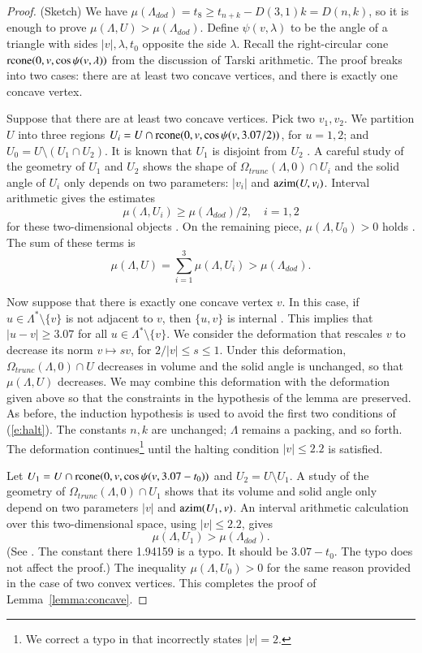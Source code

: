 \begin{proof} (Sketch)  We have 
$\mu(\Lambda_{dod}) = t_8 \ge t_{n+k} - D(3,1)k = D(n,k)$, so it is
enough to prove $\mu(\Lambda,U) > \mu(\Lambda_{dod})$. 
Define $\psi(v,\lambda)$ to be the angle of a triangle with sides $|v|,\lambda,t_0$
opposite the side $\lambda$.  Recall the right-circular cone 
${\operatorname{rcone}}(0,v,\cos\psi(v,\lambda))$ from the discussion of Tarski arithmetic.
The proof breaks into two
cases: there are at least two concave vertices, and there is exactly one concave vertex.

Suppose that there are at least two concave vertices.  Pick two $v_1,v_2$.
We partition $U$ into three
regions $U_i = U\cap {\operatorname{rcone}}(0,v,\cos\psi(v,3.07/2))$, for $u=1,2$; and
$U_0= U\setminus (U_1\cap U_2)$.  It is known that
$U_1$ is disjoint from $U_2$ \cite[Lemma~3.7]{arx}.   A careful study of the geometry
of $U_1$ and $U_2$ shows the shape of $\Omega_{trunc}(\Lambda,0)\cap U_i$ and the
solid angle of $U_i$ only depends
on two parameters: $|v_i|$ and ${\operatorname{azim}}(U,v_i)$.  Interval arithmetic gives
the estimates
  $$\mu(\Lambda,U_i) \ge \mu(\Lambda_{dod})/2,\quad i=1,2$$
for these two-dimensional objects \cite[sec.7.2.6]{arx}.  On the remaining piece, $\mu(\Lambda,U_0)>0$ holds
\cite[p.138]{DCG}.  The sum of these terms is
  $$
  \mu(\Lambda,U) = \sum_{i=1}^3 \mu(\Lambda,U_i) > \mu(\Lambda_{dod}).
  $$

Now suppose that there is exactly one concave vertex $v$.  In this case, if $u\in\Lambda^*\setminus\{v\}$
is not adjacent to $v$, then $\{u,v\}$ is internal \cite[p.140]{DCG}.  This implies
that $|u-v|\ge 3.07$ for all $u\in\Lambda^*\setminus\{v\}$.
We consider the deformation that rescales $v$ to decrease its norm $v\mapsto s v$, for 
$2/|v|\le s\le 1$. Under this deformation, $\Omega_{trunc}(\Lambda,0)\cap U$ decreases
in volume and the solid angle is unchanged, so that $\mu(\Lambda,U)$ decreases.
We may combine this deformation with the deformation given above so that the
constraints in the hypothesis of the lemma are preserved.  As before, the induction
hypothesis is used to avoid the first two conditions of (\ref{e:halt}).
The constants $n,k$ are unchanged; $\Lambda$ remains a packing, and so forth.
The deformation continues\footnote{We correct a typo in \cite{arx} that  incorrectly states $|v|=2$.} until the halting condition $|v|\le 2.2$ is satisfied. 

Let $U_1 = U\cap {\operatorname{rcone}}(0,v,\cos\psi(v,3.07-t_0))$ and $U_2 = U
\setminus U_1$.  A study of the geometry of $\Omega_{trunc}(\Lambda,0)
\cap U_1$ shows that its volume and solid angle only depend 
on two parameters $|v|$ and
${\operatorname{azim}}(U_1,v)$.  An interval arithmetic calculation over this
two-dimensional space, using $|v|\le 2.2$, gives
$$
\mu(\Lambda,U_1) > \mu(\Lambda_{dod}).
$$
(See \cite[sec.7.2.6]{arx}. The constant there 1.94159 is a typo.
It should be $3.07-t_0$.  The typo does not affect the proof.)
The inequality $\mu(\Lambda,U_0)>0$ for the same reason provided
in the case of two convex vertices.  This completes
the proof of Lemma~\ref{lemma:concave}.
\end{proof}


